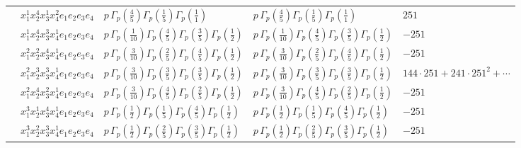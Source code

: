 \documentclass[11pt]{article}
\begin{document}
\begin{table}[ht]
{\begin{tabular}{@{}lllll@{}}
 & $x_{1}^{1} x_{2}^{4} x_{3}^{1} x_{4}^{2}  e_{1} e_{2} e_{3} e_{4}$ & $p \, \Gamma_p \left( \frac{4}{5} \right) \Gamma_p \left( \frac{1}{5} \right) \Gamma_p \left( \frac{1}{1} \right)$ & $p \, \Gamma_p \left( \frac{4}{5} \right) \Gamma_p \left( \frac{1}{5} \right) \Gamma_p \left( \frac{1}{1} \right)$ & $251$ \\
 & $x_{1}^{1} x_{2}^{4} x_{3}^{3} x_{4}^{1}  e_{1} e_{2} e_{3} e_{4}$ & $p \, \Gamma_p \left( \frac{1}{10} \right) \Gamma_p \left( \frac{4}{5} \right) \Gamma_p \left( \frac{3}{5} \right) \Gamma_p \left( \frac{1}{2} \right)$ & $p \, \Gamma_p \left( \frac{1}{10} \right) \Gamma_p \left( \frac{4}{5} \right) \Gamma_p \left( \frac{3}{5} \right) \Gamma_p \left( \frac{1}{2} \right)$ & $-251$ \\
 & $x_{1}^{2} x_{2}^{2} x_{3}^{4} x_{4}^{1}  e_{1} e_{2} e_{3} e_{4}$ & $p \, \Gamma_p \left( \frac{3}{10} \right) \Gamma_p \left( \frac{2}{5} \right) \Gamma_p \left( \frac{4}{5} \right) \Gamma_p \left( \frac{1}{2} \right)$ & $p \, \Gamma_p \left( \frac{3}{10} \right) \Gamma_p \left( \frac{2}{5} \right) \Gamma_p \left( \frac{4}{5} \right) \Gamma_p \left( \frac{1}{2} \right)$ & $-251$ \\
 & $x_{1}^{2} x_{2}^{3} x_{3}^{3} x_{4}^{1}  e_{1} e_{2} e_{3} e_{4}$ & $p \, \Gamma_p \left( \frac{3}{10} \right) \Gamma_p \left( \frac{3}{5} \right) \Gamma_p \left( \frac{3}{5} \right) \Gamma_p \left( \frac{1}{2} \right)$ & $p \, \Gamma_p \left( \frac{3}{10} \right) \Gamma_p \left( \frac{3}{5} \right) \Gamma_p \left( \frac{3}{5} \right) \Gamma_p \left( \frac{1}{2} \right)$ & $144{\cdot}251{+}241{\cdot}251^{2}{+}\cdots$ \\
 & $x_{1}^{2} x_{2}^{4} x_{3}^{2} x_{4}^{1}  e_{1} e_{2} e_{3} e_{4}$ & $p \, \Gamma_p \left( \frac{3}{10} \right) \Gamma_p \left( \frac{4}{5} \right) \Gamma_p \left( \frac{2}{5} \right) \Gamma_p \left( \frac{1}{2} \right)$ & $p \, \Gamma_p \left( \frac{3}{10} \right) \Gamma_p \left( \frac{4}{5} \right) \Gamma_p \left( \frac{2}{5} \right) \Gamma_p \left( \frac{1}{2} \right)$ & $-251$ \\
 & $x_{1}^{3} x_{2}^{1} x_{3}^{4} x_{4}^{1}  e_{1} e_{2} e_{3} e_{4}$ & $p \, \Gamma_p \left( \frac{1}{2} \right) \Gamma_p \left( \frac{1}{5} \right) \Gamma_p \left( \frac{4}{5} \right) \Gamma_p \left( \frac{1}{2} \right)$ & $p \, \Gamma_p \left( \frac{1}{2} \right) \Gamma_p \left( \frac{1}{5} \right) \Gamma_p \left( \frac{4}{5} \right) \Gamma_p \left( \frac{1}{2} \right)$ & $-251$ \\
 & $x_{1}^{3} x_{2}^{2} x_{3}^{3} x_{4}^{1}  e_{1} e_{2} e_{3} e_{4}$ & $p \, \Gamma_p \left( \frac{1}{2} \right) \Gamma_p \left( \frac{2}{5} \right) \Gamma_p \left( \frac{3}{5} \right) \Gamma_p \left( \frac{1}{2} \right)$ & $p \, \Gamma_p \left( \frac{1}{2} \right) \Gamma_p \left( \frac{2}{5} \right) \Gamma_p \left( \frac{3}{5} \right) \Gamma_p \left( \frac{1}{2} \right)$ & $-251$ \\

\end{tabular}}
\end{table}
\end{document}
